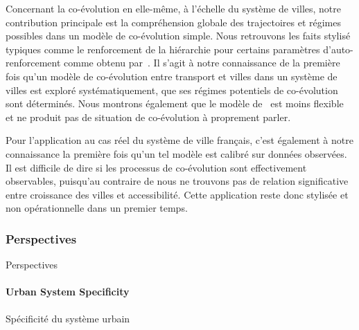 Concernant la co-évolution en elle-même, à l'échelle du système de villes, notre contribution principale est la compréhension globale des trajectoires et régimes possibles dans un modèle de co-évolution simple. Nous retrouvons les faits stylisé typiques comme le renforcement de la hiérarchie pour certains paramètres d'auto-renforcement comme obtenu par~\cite{baptistemodeling}. Il s'agit à notre connaissance de la première fois qu'un modèle de co-évolution entre transport et villes dans un système de villes est exploré systématiquement, que ses régimes potentiels de co-évolution sont déterminés. Nous montrons également que le modèle de~\cite{schmitt2014modelisation} est moins flexible et ne produit pas de situation de co-évolution à proprement parler.

Pour l'application au cas réel du système de ville français, c'est également à notre connaissance la première fois qu'un tel modèle est calibré sur données observées. Il est difficile de dire si les processus de co-évolution sont effectivement observables, puisqu'au contraire de \cite{bretagnolle2003vitesse} nous ne trouvons pas de relation significative entre croissance des villes et accessibilité. Cette application reste donc stylisée et non opérationnelle dans un premier temps.




\subsubsection{Perspectives}{Perspectives}


\paragraph{Urban System Specificity}{Spécificité du système urbain}


